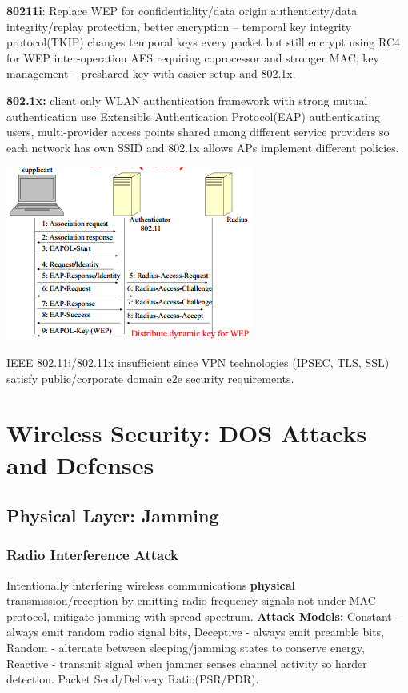 \documentclass[9pt]{extarticle}
\begin{document}
\begin{multicols}{2}
\textbf{80211i}: Replace WEP for confidentiality/data origin authenticity/data integrity/replay protection, better encryption – temporal key integrity protocol(TKIP) changes temporal keys every packet but still encrypt using RC4 for WEP inter-operation AES requiring coprocessor and stronger MAC, key management – preshared key with easier setup and 802.1x.

\textbf{802.1x:} client only WLAN authentication framework with strong mutual authentication use Extensible Authentication Protocol(EAP) authenticating users, multi-provider access points shared among different service providers so each network has own SSID and 802.1x allows APs implement different policies.

\includegraphics{8021x.png}

IEEE 802.11i/802.11x insufficient since VPN technologies (IPSEC, TLS, SSL) satisfy public/corporate domain e2e security requirements.

\section{Wireless Security: DOS Attacks and Defenses}

\subsection{Physical Layer: Jamming}

\subsubsection{Radio Interference Attack}

Intentionally interfering wireless communications \textbf{physical} transmission/reception by emitting radio frequency signals not under MAC protocol, mitigate jamming with spread spectrum. \textbf{Attack Models:} Constant – always emit random radio signal bits, Deceptive - always emit preamble bits, Random - alternate between sleeping/jamming states to conserve energy, Reactive - transmit signal when jammer senses channel activity so harder detection. Packet Send/Delivery Ratio(PSR/PDR). 


\end{multicols}
\end{document}
